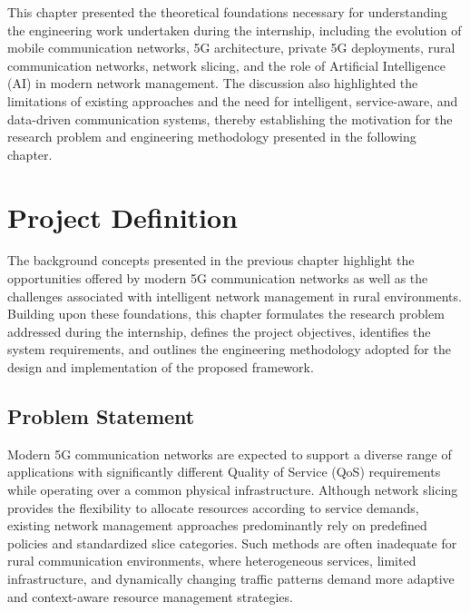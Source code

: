 \documentclass[12pt,a4paper]{report}
\begin{document}
This chapter presented the theoretical foundations necessary for understanding the engineering work undertaken during the internship, including the evolution of mobile communication networks, 5G architecture, private 5G deployments, rural communication networks, network slicing, and the role of Artificial Intelligence (AI) in modern network management. The discussion also highlighted the limitations of existing approaches and the need for intelligent, service-aware, and data-driven communication systems, thereby establishing the motivation for the research problem and engineering methodology presented in the following chapter.


	
	\chapter{Project Definition}
	\label{chap:problem_statement}
	
	The background concepts presented in the previous chapter highlight the opportunities offered by modern 5G communication networks as well as the challenges associated with intelligent network management in rural environments. Building upon these foundations, this chapter formulates the research problem addressed during the internship, defines the project objectives, identifies the system requirements, and outlines the engineering methodology adopted for the design and implementation of the proposed framework.
	
	\section{Problem Statement}
	\label{sec:problem_statement}
	
	Modern 5G communication networks are expected to support a diverse range of applications with significantly different Quality of Service (QoS) requirements while operating over a common physical infrastructure. Although network slicing provides the flexibility to allocate resources according to service demands, existing network management approaches predominantly rely on predefined policies and standardized slice categories. Such methods are often inadequate for rural communication environments, where heterogeneous services, limited infrastructure, and dynamically changing traffic patterns demand more adaptive and context-aware resource management strategies.
	
\end{document}
